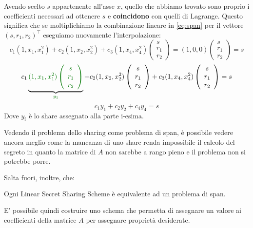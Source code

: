 \begin{remark}
Avendo scelto $s$ appartenente all'asse $x$, quello che abbiamo trovato sono proprio i coefficienti necessari ad ottenere $s$ e \textbf{coincidono} con quelli di Lagrange. Questo significa che se moltiplichiamo la combinazione lineare in \cref{eq:span} per il vettore $(s,r_1,r_2)^\top$ eseguiamo nuovamente l'interpolazione:
\[
c_1(1,x_1,x_1^2)+c_2(1,x_2,x_2^2)+c_3(1,x_4,x_4^2)\left(\begin{array}{c}
  s\\
  r_1\\
  r_2
\end{array}\right)=(1,0,0)\left(\begin{array}{c}
  s\\
  r_1\\
  r_2
\end{array}\right)=s
\]
\[c_1\underbrace{\textcolor{main}{(1,x_1,x_1^2)\left(\begin{array}{c}
  s\\
  r_1\\
  r_2
\end{array}\right)}}_{\textcolor{main}{y_1}}+c_2(1,x_2,x_2^2)\left(\begin{array}{c}
  s\\
  r_1\\
  r_2
\end{array}\right)+c_3(1,x_4,x_4^2)\left(\begin{array}{c}
  s\\
  r_1\\
  r_2
\end{array}\right)=s\]
\[c_1y_1+c_2y_2+c_4y_4=s\]
Dove $y_i$ è lo share assegnato alla parte i-esima.
\end{remark}
\begin{remark}
Vedendo il problema dello sharing come problema di span, è possibile vedere ancora meglio come la mancanza di uno share renda impossibile il calcolo del segreto in quanto la matrice di $A$ non sarebbe a rango pieno e il problema non si potrebbe porre.
\end{remark}
Salta fuori, inoltre, che:
\begin{theorem}[LSSS = MSP\footnotemark]
Ogni Linear Secret Sharing Scheme è equivalente ad un problema di span.
\end{theorem}
E' possibile quindi costruire uno schema che permetta di assegnare un valore ai coefficienti della matrice $A$ per assegnare proprietà desiderate.
